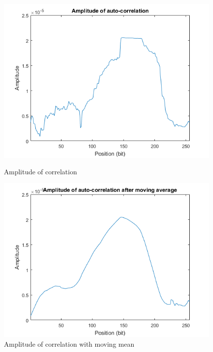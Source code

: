 \documentclass[a4paper]{article}
\begin{document}
	\begin{figure}[h]
		\begin{minipage}[t]{0.5\linewidth}
			\centering
			\includegraphics[scale=0.5]{figures/Amp_auto.png}
			\centering
			\caption{Amplitude of correlation}
            \label{fig:Amp_corr}
		\end{minipage}
		\begin{minipage}[t]{0.5\linewidth}
			\centering
			\includegraphics[scale=0.5]{figures/Amp_automean.png}
			\centering
			\caption{Amplitude of correlation with moving mean}
            \label{fig:Amp_corrmean}
		\end{minipage}
	\end{figure}
\end{document}

